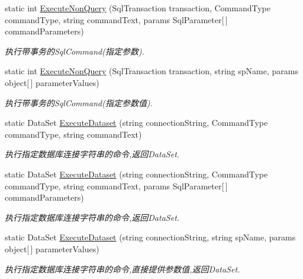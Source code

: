 \begin{DoxyCompactItemize}
static int \hyperlink{class_x_c_l_net_tools_1_1_data_base_1_1_m_s_s_q_l_1_1_sql_helper_a5de7d31376dfc5f991e9d72a776f6083}{Execute\+Non\+Query} (Sql\+Transaction transaction, Command\+Type command\+Type, string command\+Text, params Sql\+Parameter\mbox{[}$\,$\mbox{]} command\+Parameters)
\begin{DoxyCompactList}\small\item\em 执行带事务的\+Sql\+Command(指定参数). \end{DoxyCompactList}\item 
static int \hyperlink{class_x_c_l_net_tools_1_1_data_base_1_1_m_s_s_q_l_1_1_sql_helper_a220b490f5663d558a608164da5e17097}{Execute\+Non\+Query} (Sql\+Transaction transaction, string sp\+Name, params object\mbox{[}$\,$\mbox{]} parameter\+Values)
\begin{DoxyCompactList}\small\item\em 执行带事务的\+Sql\+Command(指定参数值). \end{DoxyCompactList}\item 
static Data\+Set \hyperlink{class_x_c_l_net_tools_1_1_data_base_1_1_m_s_s_q_l_1_1_sql_helper_a3418c950b693b80d623232b0d50c3924}{Execute\+Dataset} (string connection\+String, Command\+Type command\+Type, string command\+Text)
\begin{DoxyCompactList}\small\item\em 执行指定数据库连接字符串的命令,返回\+Data\+Set. \end{DoxyCompactList}\item 
static Data\+Set \hyperlink{class_x_c_l_net_tools_1_1_data_base_1_1_m_s_s_q_l_1_1_sql_helper_af4a5f8cf018d03e7535ff21eb149c625}{Execute\+Dataset} (string connection\+String, Command\+Type command\+Type, string command\+Text, params Sql\+Parameter\mbox{[}$\,$\mbox{]} command\+Parameters)
\begin{DoxyCompactList}\small\item\em 执行指定数据库连接字符串的命令,返回\+Data\+Set. \end{DoxyCompactList}\item 
static Data\+Set \hyperlink{class_x_c_l_net_tools_1_1_data_base_1_1_m_s_s_q_l_1_1_sql_helper_afc20f8a8ff547e53fe98526d493e598f}{Execute\+Dataset} (string connection\+String, string sp\+Name, params object\mbox{[}$\,$\mbox{]} parameter\+Values)
\begin{DoxyCompactList}\small\item\em 执行指定数据库连接字符串的命令,直接提供参数值,返回\+Data\+Set. \end{DoxyCompactList}\item 

\end{DoxyCompactItemize}
